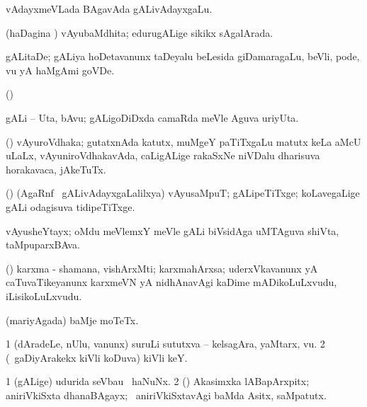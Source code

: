 {{{{{{\bentry
{}
 \gl{\nA}\bmng
vAdayxmeVLada BAgavAda gALivAdayxgaLu. 
\emng
\eentry

\bentry
{}
  \gl{\gu}\bmng
(haDagina \vi) vAyubaMdhita; edurugALige sikikx sAgalArada. 
\emng
\eentry

\bentry
{}
  \gl{\nA}\bmng
gALitaDe; gALiya hoDetavanunx taDeyalu beLesida giDamaragaLu, beVli, pode, \mo vu yA haMgAmi goVDe. 
\emng
\eentry

\bentry
{}
  \gl{\nA}\bmng
(\ame)  
\emng
\eentry

\bentry
{}
  \gl{\nA}\bmng
gALi -- Uta, bAvu; gALigoDiDxda camaRda meVle Aguva uriyUta. 
\emng
\eentry

\bentry
{}
  \gl{\nA}\bmng
(\birx) vAyuroVdhaka; gutatxnAda katutx, muMgeY paTiTxgaLu matutx keLa aMcU uLaLx, vAyuniroVdhakavAda, caLigALige rakaSxNe niVDalu dharisuva horakavaca, jAkeTuTx. 
\emng
\eentry

\bentry
{}
  \gl{\nA}\bmng
(\saM) (AgaRnf \mo\ gALivAdayxgaLalilxya) vAyusaMpuT; gALipeTiTxge; koLavegaLige gALi odagisuva tidipeTiTxge. 
\emng
\eentry

\bentry
{}
  \gl{\nA}\bmng
vAyusheYtayx; oMdu meVlemxY meVle gALi biVsidAga uMTAguva shiVta, taMpuparxBAva. 
\emng
\eentry

\bentry
{}
  \gl{\nA}\bmng
{} 
\emng
\eentry

\bentry
{}
  \gl{\nA}\bmng
(\AmA) karxma - shamana, vishArxMti; karxmahArxsa; uderxVkavanunx yA caTuvaTikeyanunx karxmeVN yA nidhAnavAgi kaDime mADikoLuLxvudu, iLisikoLuLxvudu. 
\emng
\eentry

\bentry
{}
  \gl{\nA}\bmng
(mariyAgada) baMje moTeTx. 
\emng
\eentry

\bentry
{}
  \gl{\nA}\bmng
\bnum
\num{1} (dAradeLe, nUlu, \mo vanunx) suruLi sututxva -- kelsagAra, yaMtarx, \mo vu. 
\num{2} (\kanmu\ gaDiyArakekx kiVli koDuva) kiVli keY. 
\enum
\emng
\eentry

\bentry
{}
  \gl{\nA}\bmng
\bnum
\num{1} (gALige) udurida seVbau \mo\ haNuNx. 
\num{2} (\rUpa) Akasimxka lABapArxpitx; aniriVkiSxta dhanaBAgayx; \kanmu\ aniriVkiSxtavAgi baMda Asitx, saMpatutx. 
\enum
\emng
\eentry

}}}}}}
